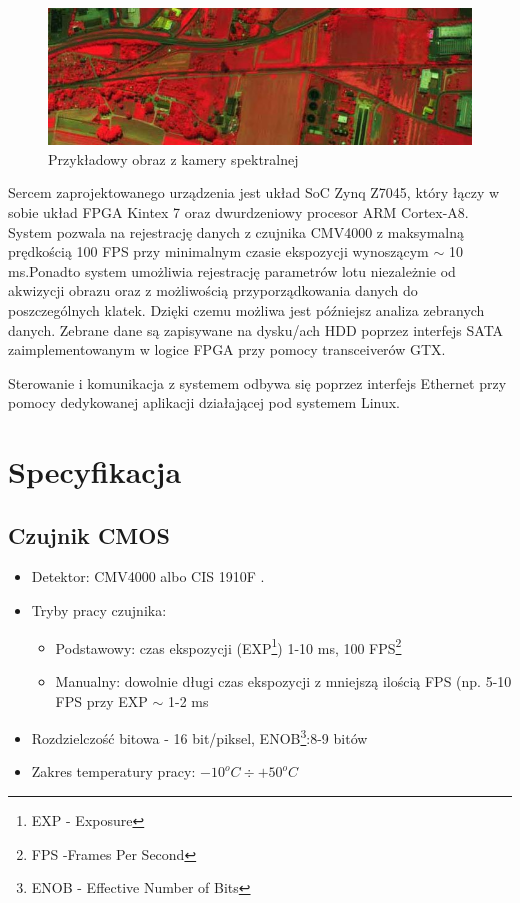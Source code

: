 \documentclass[a4paper,11pt,oneside]{book}  %
\begin{document}
\begin{figure}[htp]
	\centering
	\includegraphics[width=12cm]{spektrop_ex.jpg}
	\caption{Przykładowy obraz z kamery spektralnej\cite{SPEC_PHOTO}}
	\label{fig:EX_PHOTO}
\end{figure}


Sercem zaprojektowanego urządzenia jest układ SoC Zynq Z7045, który łączy w sobie układ FPGA Kintex 7 oraz dwurdzeniowy procesor ARM Cortex-A8. System pozwala na rejestrację danych z czujnika CMV4000 z maksymalną prędkością 100 FPS przy minimalnym czasie ekspozycji wynoszącym $\sim$ 10 ms.Ponadto system umożliwia rejestrację parametrów lotu niezależnie od akwizycji obrazu oraz z możliwością przyporządkowania danych do poszczególnych klatek. Dzięki czemu możliwa jest późniejsz analiza zebranych danych. Zebrane dane są zapisywane na dysku/ach HDD poprzez interfejs SATA zaimplementowanym w logice FPGA przy pomocy transceiverów GTX.

Sterowanie i komunikacja z systemem odbywa się poprzez interfejs Ethernet przy pomocy dedykowanej aplikacji działającej pod systemem Linux. 


\chapter{Specyfikacja}

\section{Czujnik CMOS}
\begin{itemize}
	\item Detektor: CMV4000 \cite{CMV4000} albo CIS 1910F \cite{CIS}.
	\item Tryby pracy czujnika:
		\begin{itemize}
			\item Podstawowy: czas ekspozycji (EXP\footnote{EXP - Exposure}) 1-10 ms, 100 FPS\footnote{FPS -Frames Per Second}
			\item Manualny:	dowolnie długi czas ekspozycji z mniejszą ilością FPS (np. 5-10 FPS przy EXP $\sim$ 1-2 ms
		\end{itemize}

	\item Rozdzielczość bitowa - 16 bit/piksel, ENOB\footnote{ENOB - Effective Number of Bits}:8-9 bitów
	\item Zakres temperatury pracy: $-10^{o}C \div +50^{o}C$

\end{itemize}
\end{document}

